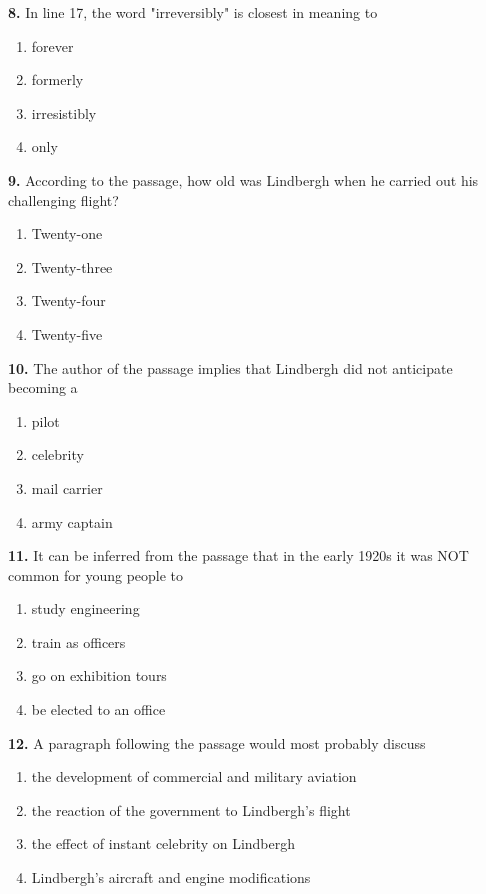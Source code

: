 \documentclass[12pt]{article}
\begin{document}
\noindent\textbf{8.} In line 17, the word "irreversibly" is closest in meaning to
\begin{enumerate}[label=(\Alph*),leftmargin=*,itemsep=0.2em]
\item forever
\item formerly
\item irresistibly
\item only
\end{enumerate}
\par
\vspace{0.25\baselineskip}
\noindent\textbf{9.} According to the passage, how old was Lindbergh when he carried out his challenging flight?
\begin{enumerate}[label=(\Alph*),leftmargin=*,itemsep=0.2em]
\item Twenty-one
\item Twenty-three
\item Twenty-four
\item Twenty-five
\end{enumerate}
\par
\vspace{0.25\baselineskip}
\noindent\textbf{10.} The author of the passage implies that Lindbergh did not anticipate becoming a
\begin{enumerate}[label=(\Alph*),leftmargin=*,itemsep=0.2em]
\item pilot
\item celebrity
\item mail carrier
\item army captain
\end{enumerate}
\par
\vspace{0.25\baselineskip}
\noindent\textbf{11.} It can be inferred from the passage that in the early 1920s it was NOT common for young people to
\begin{enumerate}[label=(\Alph*),leftmargin=*,itemsep=0.2em]
\item study engineering
\item train as officers
\item go on exhibition tours
\item be elected to an office
\end{enumerate}
\par
\vspace{0.25\baselineskip}
\noindent\textbf{12.} A paragraph following the passage would most probably discuss
\begin{enumerate}[label=(\Alph*),leftmargin=*,itemsep=0.2em]
\item the development of commercial and military aviation
\item the reaction of the government to Lindbergh's flight
\item the effect of instant celebrity on Lindbergh
\item Lindbergh's aircraft and engine modifications
\end{enumerate}
\par
\vspace{0.25\baselineskip}
\end{document}
